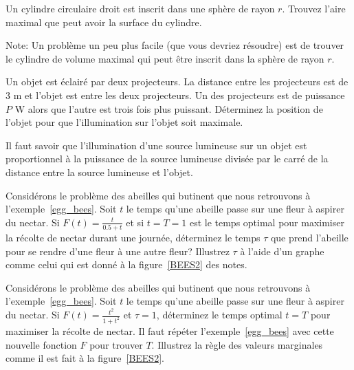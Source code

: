 \begin{question}[\eng]
Un cylindre circulaire droit est inscrit dans une sphère de rayon $r$.
Trouvez l'aire maximal que peut avoir la surface du cylindre.

\noindent Note: Un problème un peu plus facile (que vous devriez résoudre)
est de trouver le cylindre de volume maximal qui peut être inscrit dans la
sphère de rayon $r$. 
\label{6Q37}
\end{question}

\begin{question}[\eng]
Un objet est éclairé par deux projecteurs.  La distance entre les projecteurs
est de $3$ m et l'objet est entre les deux projecteurs.  Un des projecteurs
est de puissance $P$ W alors que l'autre est trois fois plus puissant.
Déterminez la position de l'objet pour que l'illumination sur l'objet soit
maximale.

Il faut savoir que l'illumination d'une source lumineuse sur un objet est
proportionnel à la puissance de la source lumineuse divisée par le carré de
la distance entre la source lumineuse et l'objet. 
\label{6Q38}
\end{question}

\begin{question}[\life]
Considérons le problème des abeilles qui butinent que nous retrouvons à
l'exemple~\ref{egg_bees}.  Soit $t$ le temps qu'une abeille passe sur
une fleur à aspirer du nectar.  Si
$\displaystyle F(t) = \frac{t}{0.5+t}$ et si $t=T=1$ est le temps
optimal pour maximiser la récolte de nectar durant une journée,
déterminez le temps $\tau$ que prend l'abeille pour se rendre d'une
fleur à une autre fleur?  Illustrez $\tau$ à l'aide d'un graphe comme
celui qui est donné à la figure~\ref{BEES2} des notes.
\label{6Q39}
\end{question}

\begin{question}[\life]
Considérons le problème des abeilles qui butinent que nous retrouvons à
l'exemple~\ref{egg_bees}.  Soit $t$ le temps qu'une abeille passe sur
une fleur à aspirer du nectar.  Si
$\displaystyle F(t) = \frac{t^2}{1+t^2}$ et $\tau = 1$, déterminez le
temps optimal $t=T$ pour maximiser la récolte de nectar.  Il faut
répéter l'exemple~\ref{egg_bees} avec cette nouvelle fonction $F$ pour
trouver $T$.  Illustrez la règle des valeurs marginales comme il est
fait à la figure~\ref{BEES2}.
\label{6Q40}
\end{question}

